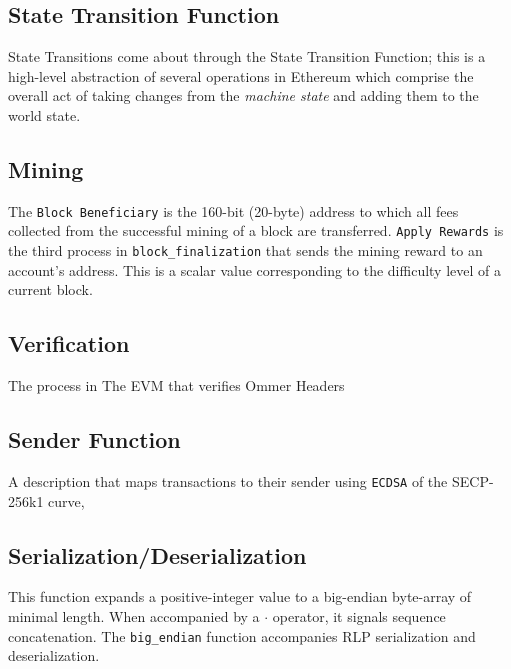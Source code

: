 \documentclass[10pt,a4paper,leqno,bibliography=totoc]{scrartcl}
\newenvironment{alphafootnotes}
{\par\edef\savedfootnotenumber{\number\value{footnote}}
\renewcommand{\thefootnote}{\alph{footnote}}
\setcounter{footnote}{0}}
{\par\setcounter{footnote}{\savedfootnotenumber}}
\begin{document}
\begin{alphafootnotes}
\begin{multicols*}{2}
		\subsection{State Transition Function}
		State Transitions come about through the State Transition Function; this is a high-level abstraction of several operations in Ethereum which comprise the overall act of taking changes from  the \textit{machine state} and adding  them to the world state.
	
		\subsection{Mining}
			The \texttt{Block Beneficiary} is the 160-bit (20-byte) address to which all fees collected from the successful mining of a block are transferred. \texttt{Apply Rewards} is the third process in \texttt{block\_finalization} that sends the mining reward to an account's address. This is a scalar value corresponding to the difficulty level of a current block. 

		\subsection{Verification}
			The process in The EVM that verifies Ommer Headers


		\subsection{Sender Function} A description that maps transactions to their sender using \texttt{ECDSA} of the SECP-256k1 curve,

		\subsection{Serialization/Deserialization}
			This function expands a positive-integer value to a big-endian byte-array of minimal length. When accompanied by a $\cdot$ operator, it signals sequence concatenation.  The \texttt{big\_endian} function  accompanies RLP serialization and deserialization.

\end{multicols*}
\end{alphafootnotes}
\end{document}
